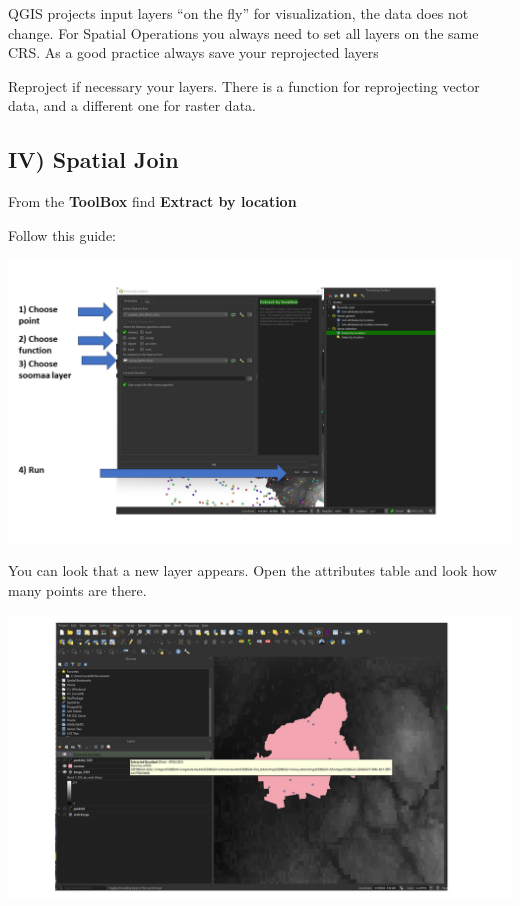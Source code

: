 \documentclass[
  letterpaper,
  DIV=11,
  numbers=noendperiod]{scrartcl}
\begin{document}
\begin{tcolorbox}[enhanced jigsaw, colbacktitle=quarto-callout-important-color!10!white, toptitle=1mm, opacityback=0, bottomtitle=1mm, bottomrule=.15mm, leftrule=.75mm, coltitle=black, left=2mm, arc=.35mm, title=\textcolor{quarto-callout-important-color}{\faExclamation}\hspace{0.5em}{Projections}, breakable, colframe=quarto-callout-important-color-frame, opacitybacktitle=0.6, rightrule=.15mm, toprule=.15mm, titlerule=0mm, colback=white]
QGIS projects input layers ``on the fly'' for visualization, the data
does not change. For Spatial Operations you always need to set all
layers on the same CRS. As a good practice always save your reprojected
layers
\end{tcolorbox}

Reproject if necessary your layers. There is a function for reprojecting
vector data, and a different one for raster data.

\hypertarget{iv-spatial-join}{%
\subsection{IV) Spatial Join}\label{iv-spatial-join}}

From the \textbf{ToolBox} find \textbf{Extract by location}

Follow this guide:

\includegraphics{Lab1/qgis_ss/QGIS_ss14.png}

You can look that a new layer appears. Open the attributes table and
look how many points are there.

\includegraphics{Lab1/qgis_ss/QGIS_ss15.png}
\end{document}
